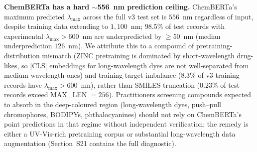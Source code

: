 \documentclass[journal=jcisd8,manuscript=article]{achemso}
\newcommand{\added}[1]{{\color{addedblue}#1}}
\begin{document}
\added{\textbf{ChemBERTa has a hard $\sim$556~nm prediction ceiling.} ChemBERTa's maximum predicted $\lambda_{\max}$ across the full v3 test set is $556$~nm regardless of input, despite training data extending to $1{,}100$~nm; $98.5$\% of test records with experimental $\lambda_{\max} > 600$~nm are underpredicted by $\geq 50$~nm (median underprediction $126$~nm). We attribute this to a compound of pretraining-distribution mismatch (ZINC pretraining is dominated by short-wavelength drug-likes, so [CLS] embeddings for long-wavelength dyes are not well-separated from medium-wavelength ones) and training-target imbalance ($8.3$\% of v3 training records have $\lambda_{\max} > 600$~nm), rather than SMILES truncation ($0.23$\% of test records exceed MAX\_LEN $= 256$). Practitioners screening compounds expected to absorb in the deep-coloured region (long-wavelength dyes, push--pull chromophores, BODIPYs, phthalocyanines) should not rely on ChemBERTa's point predictions in that regime without independent verification; the remedy is either a UV-Vis-rich pretraining corpus or substantial long-wavelength data augmentation (Section~S21 contains the full diagnostic).}
\end{document}
